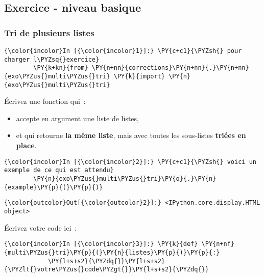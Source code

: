     
    
    
    

    

    \hypertarget{exercice---niveau-basique}{%
\subsection{Exercice - niveau basique}\label{exercice---niveau-basique}}

    \hypertarget{tri-de-plusieurs-listes}{%
\subsubsection{Tri de plusieurs listes}\label{tri-de-plusieurs-listes}}

    \begin{Verbatim}[commandchars=\\\{\}]
{\color{incolor}In [{\color{incolor}1}]:} \PY{c+c1}{\PYZsh{} pour charger l\PYZsq{}exercice}
        \PY{k+kn}{from} \PY{n+nn}{corrections}\PY{n+nn}{.}\PY{n+nn}{exo\PYZus{}multi\PYZus{}tri} \PY{k}{import} \PY{n}{exo\PYZus{}multi\PYZus{}tri}
\end{Verbatim}


    Écrivez une fonction qui~:

\begin{itemize}
\tightlist
\item
  accepte en argument une liste de listes,
\item
  et qui retourne \textbf{la même liste}, mais avec toutes les
  sous-listes \textbf{triées en place}.
\end{itemize}

    \begin{Verbatim}[commandchars=\\\{\}]
{\color{incolor}In [{\color{incolor}2}]:} \PY{c+c1}{\PYZsh{} voici un exemple de ce qui est attendu}
        \PY{n}{exo\PYZus{}multi\PYZus{}tri}\PY{o}{.}\PY{n}{example}\PY{p}{(}\PY{p}{)}
\end{Verbatim}


\begin{Verbatim}[commandchars=\\\{\}]
{\color{outcolor}Out[{\color{outcolor}2}]:} <IPython.core.display.HTML object>
\end{Verbatim}
            
    Écrivez votre code ici~:

    \begin{Verbatim}[commandchars=\\\{\}]
{\color{incolor}In [{\color{incolor}3}]:} \PY{k}{def} \PY{n+nf}{multi\PYZus{}tri}\PY{p}{(}\PY{n}{listes}\PY{p}{)}\PY{p}{:} 
            \PY{l+s+s2}{\PYZdq{}}\PY{l+s+s2}{\PYZlt{}votre\PYZus{}code\PYZgt{}}\PY{l+s+s2}{\PYZdq{}}
\end{Verbatim}



